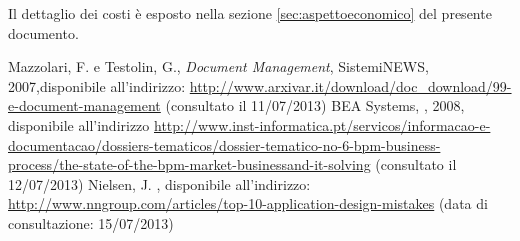 Il dettaglio dei costi è esposto nella sezione \ref{sec:aspettoeconomico} del presente documento.

\begin{thebibliography}{90}
   Mazzolari, F. e Testolin, G., \emph{Document Management}, SistemiNEWS, 2007,\newline disponibile all'indirizzo: \url{http://www.arxivar.it/download/doc_download/99-e-document-management} (consultato il 11/07/2013)
   BEA Systems, , 2008, \newline disponibile all'indirizzo \url{http://www.inst-informatica.pt/servicos/informacao-e-documentacao/dossiers-tematicos/dossier-tematico-no-6-bpm-business-process/the-state-of-the-bpm-market-businessand-it-solving} (consultato il 12/07/2013)
   Nielsen, J. , \newline disponibile all'indirizzo: \url{http://www.nngroup.com/articles/top-10-application-design-mistakes} (data di consultazione:  15/07/2013)
\end{thebibliography}


